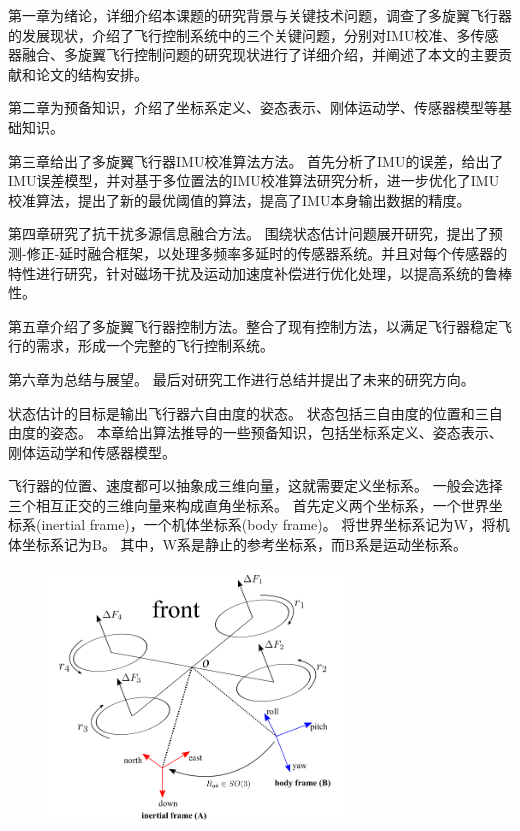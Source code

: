 \documentclass[
  type=master
]{gdutthesis}
\begin{document}
第一章为绪论，详细介绍本课题的研究背景与关键技术问题，调查了多旋翼飞行器的发展现状，介绍了飞行控制系统中的三个关键问题，分别对IMU校准、多传感器融合、多旋翼飞行控制问题的研究现状进行了详细介绍，并阐述了本文的主要贡献和论文的结构安排。

第二章为预备知识，介绍了坐标系定义、姿态表示、刚体运动学、传感器模型等基础知识。

第三章给出了多旋翼飞行器IMU校准算法方法。
首先分析了IMU的误差，给出了IMU误差模型，并对基于多位置法的IMU校准算法研究分析，进一步优化了IMU校准算法，提出了新的最优阈值的算法，提高了IMU本身输出数据的精度。

第四章研究了抗干扰多源信息融合方法。
围绕状态估计问题展开研究，提出了预测-修正-延时融合框架，以处理多频率多延时的传感器系统。并且对每个传感器的特性进行研究，针对磁场干扰及运动加速度补偿进行优化处理，以提高系统的鲁棒性。

第五章介绍了多旋翼飞行器控制方法。整合了现有控制方法，以满足飞行器稳定飞行的需求，形成一个完整的飞行控制系统。

第六章为总结与展望。
最后对研究工作进行总结并提出了未来的研究方向。



状态估计的目标是输出飞行器六自由度的状态。
状态包括三自由度的位置和三自由度的姿态。
本章给出算法推导的一些预备知识，包括坐标系定义、姿态表示、刚体运动学和传感器模型。


飞行器的位置、速度都可以抽象成三维向量，这就需要定义坐标系。
一般会选择三个相互正交的三维向量来构成直角坐标系。
首先定义两个坐标系，一个世界坐标系(inertial frame)，一个机体坐标系(body frame)。
将世界坐标系记为W，将机体坐标系记为B。
其中，W系是静止的参考坐标系，而B系是运动坐标系。
\begin{figure}[htbp]
	\centering
	\includegraphics[width=0.7\textwidth]{屏幕截图 2022-03-31 222546.png}
	\label{fig:modelaerialrobot}
\end{figure}
\end{document}
